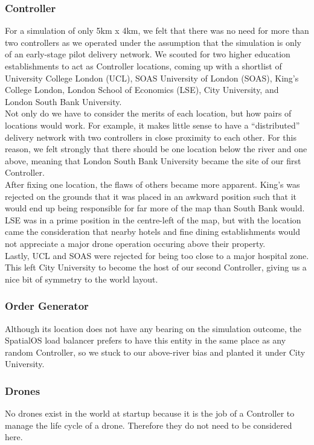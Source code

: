 \documentclass[a4paper,12pt,titlepage]{article}
\begin{document}
\subsubsection{Controller}
For a simulation of only 5km x 4km, we felt that there was no need for more than two controllers as we operated under the assumption that the simulation is only of an early-stage pilot delivery network. We scouted for two higher education establishments to act as Controller locations, coming up with a shortlist of University College London (UCL), SOAS University of London (SOAS), King's College London, London School of Economics (LSE), City University, and London South Bank University.\\

Not only do we have to consider the merits of each location, but how pairs of locations would work. For example, it makes little sense to have a ``distributed'' delivery network with two controllers in close proximity to each other. For this reason, we felt strongly that there should be one location below the river and one above, meaning that London South Bank University became the site of our first Controller.\\

After fixing one location, the flaws of others became more apparent. King's was rejected on the grounds that it was placed in an awkward position such that it would end up being responsible for far more of the map than South Bank would. LSE was in a prime position in the centre-left of the map, but with the location came the consideration that nearby hotels and fine dining establishments would not appreciate a major drone operation occuring above their property.\\

Lastly, UCL and SOAS were rejected for being too close to a major hospital zone. This left City University to become the host of our second Controller, giving us a nice bit of symmetry to the world layout.

\subsubsection{Order Generator}
Although its location does not have any bearing on the simulation outcome, the SpatialOS load balancer prefers to have this entity in the same place as any random Controller, so we stuck to our above-river bias and planted it under City University.

\subsubsection{Drones}
No drones exist in the world at startup because it is the job of a Controller to manage the life cycle of a drone. Therefore they do not need to be considered here.
\end{document}
